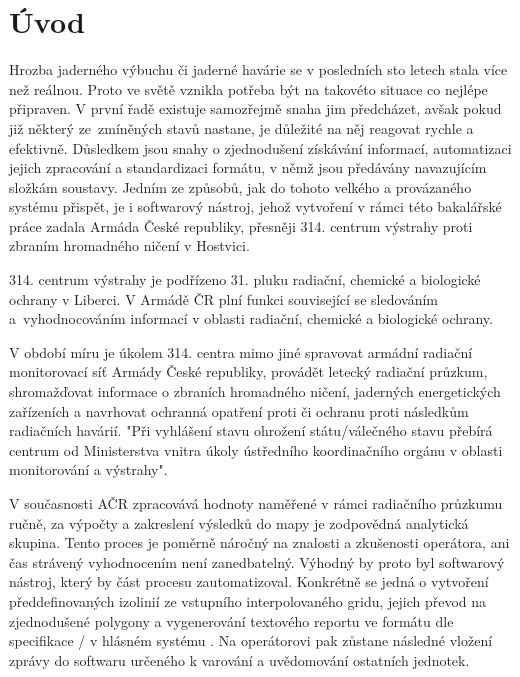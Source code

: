 \chapter{Úvod}
\label{1-uvod}

Hrozba jaderného výbuchu či jaderné havárie se v
posledních sto letech stala více než reálnou. Proto ve světě vznikla
potřeba být na takovéto situace co nejlépe připraven. V první řadě
existuje samozřejmě snaha jim předcházet, avšak pokud již některý 
ze~zmíněných stavů nastane, je důležité na něj reagovat rychle a
efektivně.  Důsledkem jsou snahy o zjednodušení získávání informací,
automatizaci jejich zpracování a standardizaci formátu, v němž jsou
předávány navazujícím složkám soustavy. Jedním ze způsobů, jak do
tohoto velkého a provázaného systému přispět, je i softwarový
nástroj, jehož vytvoření v rámci této bakalářské práce zadala Armáda
České republiky, přesněji 314. centrum výstrahy proti zbraním
hromadného ničení v Hostvici.

314. centrum výstrahy  je podřízeno 31. pluku radiační,
chemické a bio\-logické ochrany v Liberci. V Armádě ČR plní funkci
související se sledováním a~vyhodnocováním informací v oblasti
radiační, chemické a biologické ochrany.

V období míru je úkolem 314. centra mimo jiné spravovat armádní
radiační monitorovací síť Armády České republiky, provádět letecký
radiační průzkum, shromažďovat informace o zbraních hromadného ničení,
jaderných energetických zařízeních a navrhovat ochranná opatření proti
 či ochranu proti následkům radiačních havárií. "Při vyhlášení
stavu ohrožení státu/válečného stavu přebírá centrum od Ministerstva
vnitra úkoly ústředního koordinačního orgánu v oblasti moni\-torování a
výstrahy". \cite{ZHN}

V současnosti AČR zpracovává hodnoty naměřené v rámci radiačního
průzkumu ručně, za výpočty a zakreslení výsledků do mapy je zodpovědná
analytická skupina. Tento proces je poměrně náročný na znalosti a
zkušenosti operátora, ani čas strávený vyhodnocením není
zanedbatelný. Výhodný by proto byl softwarový nástroj, který by část
procesu zautomatizoval. Konkrétně se jedná o vytvoření
předdefinovaných izolinií ze vstupního interpolovaného gridu, jejich
převod na zjednodušené polygony a vygenerování textového reportu ve
formátu dle specifikace / v hlásném systému
. Na operátorovi pak zůstane následné vložení zprávy do
softwaru určeného k varování a uvědomování ostatních jednotek.

